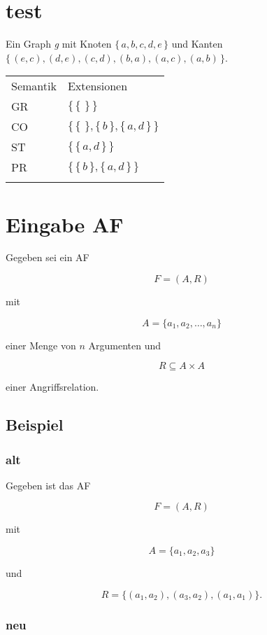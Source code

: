 \section{test}\label{test}

Ein Graph \emph{g} mit Knoten $\{\,a,b,c,d,e\,\} $ und Kanten
$\{\,(e,c),(d,e),(c,d),(b,a),(a,c),(a,b)\,\} $.

\begin{longtable}[c]{@{}ll@{}}
\toprule\addlinespace
Semantik & Extensionen
\\\addlinespace
\midrule\endhead
GR & $\{\,\{\,\,\}\,\} $
\\\addlinespace
CO & $\{\,\{\,\,\},\{\,b\,\},\{\,a,d\,\}\,\} $
\\\addlinespace
ST & $\{\,\{\,a,d\,\}\,\} $
\\\addlinespace
PR & $\{\,\{\,b\,\},\{\,a,d\,\}\,\} $
\\\addlinespace
\bottomrule
\end{longtable}

\section{Eingabe AF}\label{eingabe-af}

Gegeben sei ein AF

\[ F = (A,R) \]

mit

\[ A = \{a_1,a_2,\dots,a_n\} \]

einer Menge von $n$ Argumenten und

\[ R \subseteq A \times A \]

einer Angriffsrelation.

\subsection{Beispiel}\label{beispiel}

\subsubsection{alt}\label{alt}

Gegeben ist das AF

\[ F = (A,R) \]

mit

\[ A = \{a_1,a_2,a_3\} \]

und

\[ R = \{(a_1,a_2), (a_3,a_2), (a_1,a_1)\} .\]

\subsubsection{neu}\label{neu}

